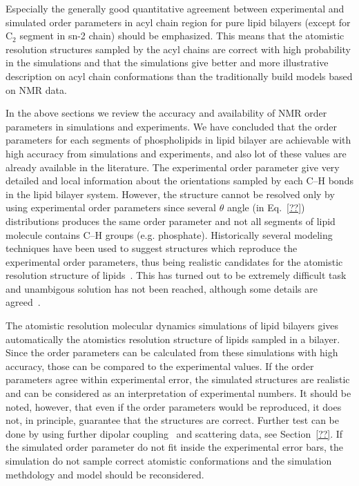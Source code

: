 \documentclass[aps,prl,superscriptaddress,twocolumn]{revtex4}
\begin{document}
Especially the generally good quantitative agreement between experimental and simulated
order parameters in acyl chain region for pure lipid bilayers (except for C$_2$ segment in sn-2 chain) should be emphasized.
This means that the atomistic resolution structures sampled by the acyl chains are correct
with high probability in the simulations and that the simulations give better and more illustrative
description on acyl chain conformations than the traditionally build models based on NMR data. 

In the above sections we review the accuracy and availability of NMR order parameters in simulations and experiments.
We have concluded that the order parameters for each segments of phospholipids in lipid bilayer are achievable
with high accuracy from simulations and experiments, and also lot of these values are already available 
in the literature. The experimental order parameter give very detailed and local information about the orientations
sampled by each C--H bonds in the lipid bilayer system. However, the structure cannot be resolved only by using 
experimental order parameters since several $\theta$ angle (in Eq.~\ref{??}) distributions produces the same
order parameter and not all segments of lipid molecule contains C--H groups (e.g. phosphate). 
Historically several modeling techniques have been used to suggest structures which reproduce the 
experimental order parameters, thus being realistic candidates for the atomistic resolution structure
of lipids~\cite{??}. This has turned out to be extremely difficult task and unambigous solution has not
been reached, although some details are agreed~\cite{??}.

The atomistic resolution molecular dynamics simulations of lipid bilayers gives automatically the 
atomistics resolution structure of lipids sampled in a bilayer. Since the order parameters can 
be calculated from these simulations with high accuracy, those can be compared to the experimental
values. If the order parameters agree within experimental error, the simulated structures are realistic
and can be considered as an interpretation of experimental numbers. 
It should be noted, however, that even if the order parameters would be reproduced, it does not, in principle, 
guarantee that the structures are correct. Further test can be done by using further dipolar coupling~\cite{??}
and scattering data, see Section~\ref{??}.
If the simulated order 
parameter do not fit inside the experimental error bars, the simulation do not sample correct
atomistic conformations and the simulation methdology and model should be reconsidered.
\end{document}
